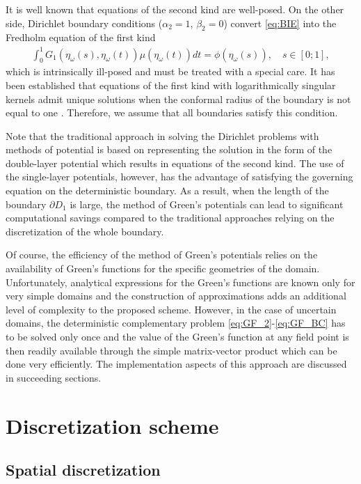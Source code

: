 It is well known that equations of the second kind are well-posed.
On the other side, Dirichlet boundary conditions ($\alpha_2=1$, $\beta_2=0$) convert \eqref{eq:BIE} into the Fredholm equation of the first kind
\begin{align} \label{eq:Dirichlet_BIE}
	\int_0^1 G_1(\eta_{\omega}(s),\eta_{\omega}(t)) \mu(\eta_{\omega}(t)) dt
	=
	\phi(\eta_{\omega}(s)),
	\quad
	s \in [0;1],
\end{align}
which is intrinsically ill-posed and must be treated with a special care.
It has been established that equations of the first kind with logarithmically singular kernels admit unique solutions when the conformal radius of the boundary is not equal to one \cite{Yan1988,Cheng1993}.
Therefore, we assume that all boundaries satisfy this condition.

Note that the traditional approach in solving the Dirichlet problems with methods of potential is based on representing the solution in the form of the double-layer potential which results in equations of the second kind.
The use of the single-layer potentials, however, has the advantage of satisfying the governing equation on the deterministic boundary.
As a result, when the length of the boundary $\partial D_1$ is large, the method of Green's potentials can lead to significant computational savings compared to the traditional approaches relying on the discretization of the whole boundary.


Of course, the efficiency of the method of Green's potentials relies on the availability of Green's functions for the specific geometries of the domain. 
Unfortunately, analytical expressions for the Green's functions are known only for very simple domains and the construction of approximations adds an additional level of complexity to the proposed scheme.
However, in the case of uncertain domains, the deterministic complementary problem \eqref{eq:GF_2}-\eqref{eq:GF_BC} has to be solved only once and the value of the Green's function at any field point is then readily available through the simple matrix-vector product which can be done very efficiently.
The implementation aspects of this approach are discussed in succeeding sections.



\section{Discretization scheme}
\label{sec:scheme}

\subsection{Spatial discretization}
\label{sec:spat_discret}

